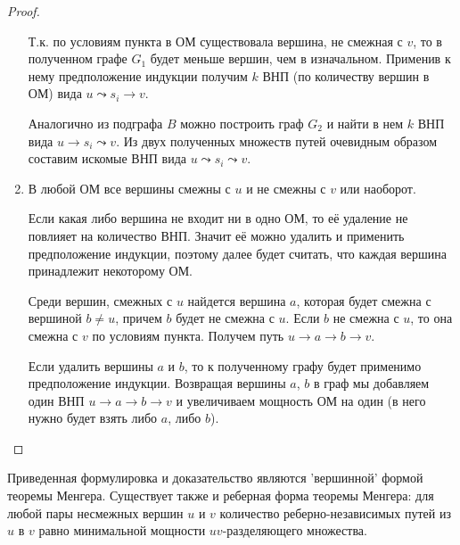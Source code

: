 \begin{proof}
\begin{enumerate}
    

    Т.к. по условиям пункта в ОМ существовала вершина, не смежная с \(v\), то в
    полученном графе \(G_{1}\) будет меньше вершин, чем в изначальном. Применив
    к нему предположение индукции получим \(k\) ВНП (по количеству вершин в ОМ)
    вида \(u \leadsto s_{i} \to v\).

    Аналогично из подграфа \(B\) можно построить граф \(G_{2}\) и найти в нем
    \(k\) ВНП вида \(u \to s_{i} \leadsto v\). Из двух полученных множеств путей
    очевидным образом составим искомые ВНП вида \(u \leadsto s_{i} \leadsto v\).

    \item В любой ОМ все вершины смежны с \(u\) и не смежны с \(v\) или
    наоборот.

    

    Если какая либо вершина не входит ни в одно ОМ, то её удаление не повлияет
    на количество ВНП. Значит её можно удалить и применить предположение
    индукции, поэтому далее будет считать, что каждая вершина принадлежит
    некоторому ОМ.

    Среди вершин, смежных с \(u\) найдется вершина \(a\), которая будет смежна с
    вершиной \(b \neq u\), причем \(b\) будет не смежна с \(u\). Если \(b\) не
    смежна с \(u\), то она смежна с \(v\) по условиям пункта. Получем путь
    \(u \to a \to b \to v\).
    
    Если удалить вершины \(a\) и \(b\), то к полученному графу будет применимо
    предположение индукции. Возвращая вершины \(a\), \(b\) в граф мы добавляем
    один ВНП \(u \to a \to b \to v\) и увеличиваем мощность ОМ на один (в него
    нужно будет взять либо \(a\), либо \(b\)).
  \end{enumerate}
\end{proof}

\begin{remark}
  Приведенная формулировка и доказательство являются 'вершинной' формой теоремы
  Менгера. Существует также и реберная форма теоремы Менгера: для любой пары
  несмежных вершин \(u\) и \(v\) количество реберно-независимых путей из \(u\) в
  \(v\) равно минимальной мощности \(uv\)-разделяющего множества.
\end{remark}
